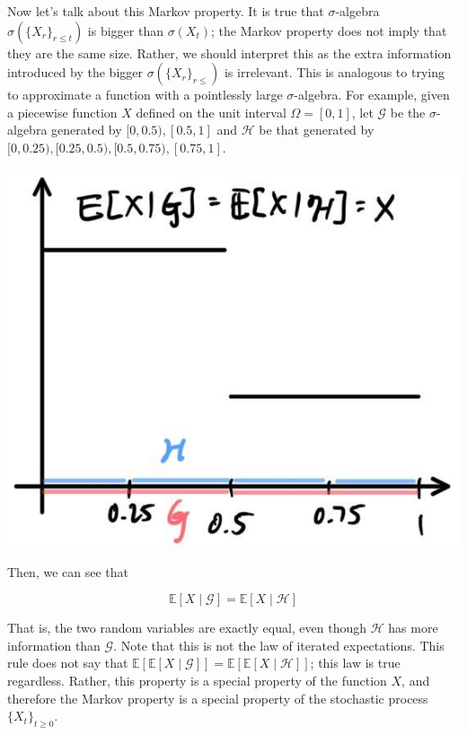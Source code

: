 \documentclass{article}
\begin{document}
    Now let's talk about this Markov property. It is true that $\sigma$-algebra $\sigma(\{X_r\}_{r \leq t})$ is bigger than $\sigma(X_t)$; the Markov property does not imply that they are the same size. Rather, we should interpret this as the extra information introduced by the bigger $\sigma(\{X_r\}_{r \leq})$ is irrelevant. This is analogous to trying to approximate a function with a pointlessly large $\sigma$-algebra. For example, given a piecewise function $X$ defined on the unit interval $\Omega = [0, 1]$, let $\mathcal{G}$ be the $\sigma$-algebra generated by $[0, 0.5), [0.5, 1]$ and $\mathcal{H}$ be that generated by $[0, 0.25), [0.25, 0.5), [0.5, 0.75), [0.75, 1]$. 

    \begin{center}
      \includegraphics[scale=0.3]{img/pointless_approximation.jpg}
    \end{center}

    Then, we can see that 

      \[\mathbb{E}[X \mid \mathcal{G}] = \mathbb{E}[X \mid \mathcal{H}]\]

    That is, the two random variables are exactly equal, even though $\mathcal{H}$ has more information than $\mathcal{G}$. Note that this is not the law of iterated expectations. This rule does not say that $\mathbb{E}[\mathbb{E}[X \mid \mathcal{G}]] = \mathbb{E}[ \mathbb{E}[X \mid \mathcal{H}]]$; this law is true regardless. Rather, this property is a special property of the function $X$, and therefore the Markov property is a special property of the stochastic process $\{X_t\}_{t \geq 0}$. 
\end{document}
